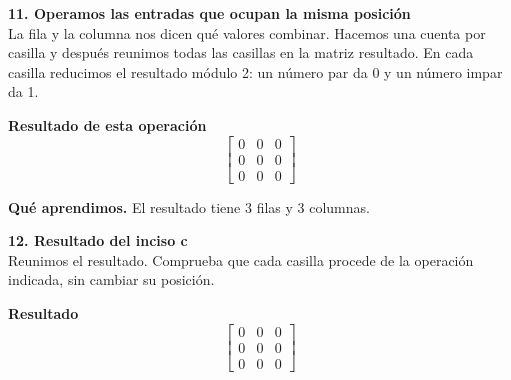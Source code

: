 \documentclass[11pt,a4paper,landscape]{article}
\begin{document}
\noindent\begin{minipage}{\linewidth}\textbf{11. Operamos las entradas que ocupan la misma posición}\\[2pt]La fila y la columna nos dicen qué valores combinar. Hacemos una cuenta por casilla y después reunimos todas las casillas en la matriz resultado. En cada casilla reducimos el resultado módulo 2: un número par da 0 y un número impar da 1.
\par{}\par\smallskip
\par\smallskip \textbf{Resultado de esta operación}\[\begin{bmatrix}0 & 0 & 0\\0 & 0 & 0\\0 & 0 & 0\end{bmatrix}\]
\par\smallskip\textbf{Qué aprendimos.} El resultado tiene 3 filas y 3 columnas.
\end{minipage}\par\medskip
\noindent\begin{minipage}{\linewidth}\textbf{12. Resultado del inciso c}\\[2pt]Reunimos el resultado. Comprueba que cada casilla procede de la operación indicada, sin cambiar su posición.
\par\smallskip \textbf{Resultado}\[\begin{bmatrix}0 & 0 & 0\\0 & 0 & 0\\0 & 0 & 0\end{bmatrix}\]
\end{minipage}\par\medskip
\end{document}
